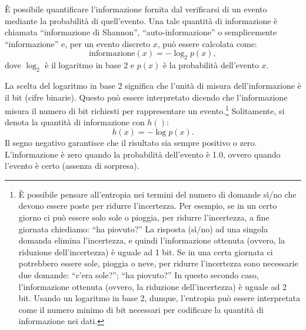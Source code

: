 \documentclass[
  10pt,
  italian,
  a4paper,
  extrafontsizes,onecolumn,openright
  ]{memoir}
\theoremstyle{definition}
\theoremstyle{definition}
\theoremstyle{definition}
\theoremstyle{definition}
\theoremstyle{remark}
\begin{document}
È possibile quantificare l'informazione fornita dal verificarsi di un evento mediante la probabilità di quell'evento. Una tale quantità di informazione è chiamata ``informazione di Shannon'', ``auto-informazione'' o semplicemente ``informazione'' e, per un evento discreto \(x\), può essere calcolata come:
\[
\text{informazione}(x) = -\log_2 p(x),
\]
dove \(\log_2\) è il logaritmo in base 2 e \(p(x)\) è la probabilità dell'evento \(x\).

La scelta del logaritmo in base 2 significa che l'unità di misura dell'informazione è il bit (cifre binarie). Questo può essere interpretato dicendo che l'informazione misura il numero di bit richiesti per rappresentare un evento.\footnote{È possibile pensare all'entropia nei termini del numero di domande sì/no che devono essere poste per ridurre l'incertezza. Per esempio, se in un certo giorno ci può essere solo sole o pioggia, per ridurre l'incertezza, a fine giornata chiediamo: ``ha piovuto?'' La risposta (sì/no) ad una singola domanda elimina l'incertezza, e quindi l'informazione ottenuta (ovvero, la riduzione dell'incertezza) è uguale ad 1 bit. Se in una certa giornata ci potrebbero essere sole, pioggia o neve, per ridurre l'incertezza sono necessarie due domande: ``c'era sole?''; ``ha piovuto?'' In questo secondo caso, l'informazione ottenuta (ovvero, la riduzione dell'incertezza) è uguale ad 2 bit. Usando un logaritmo in base 2, dunque, l'entropia può essere interpretata come il numero minimo di bit necessari per codificare la quantità di informazione nei dati.} Solitamente, si denota la quantità di informazione con \(h()\):
\[
h(x) = -\log p(x).
\]
Il segno negativo garantisce che il risultato sia sempre positivo o zero. L'informazione è zero quando la probabilità dell'evento è 1.0, ovvero quando l'evento è certo (assenza di sorpresa).
\end{document}
